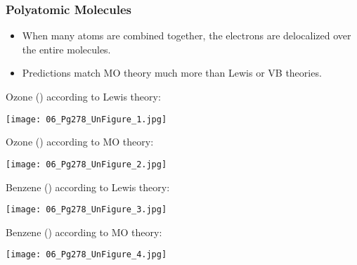 \documentclass[handout]{beamer}
\begin{document}
\clearpage

\begin{frame}[c,allowframebreaks]
	\frametitle{Polyatomic Molecules}
	\begin{itemize}
		\item When many atoms are combined together, the electrons are
			\alert{delocalized} over the entire molecules.
		\item Predictions match MO theory much more than Lewis or VB
			theories.
	\end{itemize}

	\bigskip

	Ozone () according to Lewis theory:

	\begin{center}	
		\texttt{[image: 06\_Pg278\_UnFigure\_1.jpg]}
	\end{center}

	\framebreak

	Ozone () according to MO theory:
	\begin{center}	
		\texttt{[image: 06\_Pg278\_UnFigure\_2.jpg]}
	\end{center}

	\framebreak

	Benzene () according to Lewis theory:
	\begin{center}
		\texttt{[image: 06\_Pg278\_UnFigure\_3.jpg]}
	\end{center}

	\framebreak

	Benzene () according to MO theory:
	\begin{center}
		\texttt{[image: 06\_Pg278\_UnFigure\_4.jpg]}
	\end{center}
\end{frame}
\end{document}
